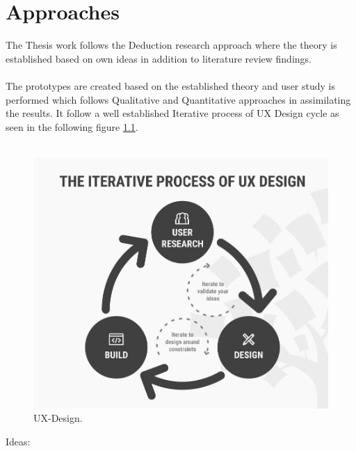 \chapter{Approaches}
\label{ch:approaches}

The Thesis work follows the Deduction research approach where the theory is established based on own ideas in addition to literature review findings. \\ \\

The prototypes are created based on the established theory and user study is performed which follows Qualitative and Quantitative approaches in assimilating the results. It follow a well established Iterative process of UX Design cycle as seen in the following figure \ref{fig:ux-design}. \\ \\  


\begin{figure}[hbt!]
	\centering
	\includegraphics[width=\linewidth]{figures/ux-design}
	\caption{UX-Design.}
	\label{fig:ux-design}
\end{figure}


Ideas: \\ \\


